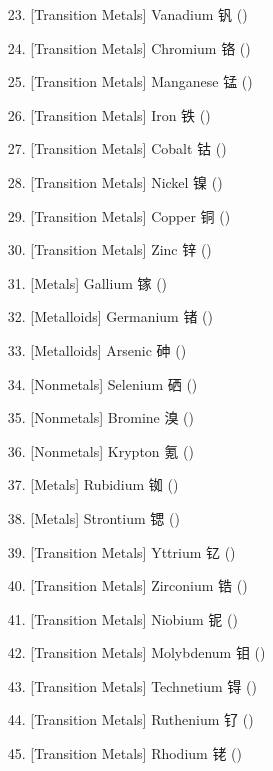 \begin{itemize}
\begin{itemize}
        \item[23.]      [Transition Metals]     Vanadium        钒  ()
        \item[24.]      [Transition Metals]     Chromium        铬  ()
        \item[25.]      [Transition Metals]     Manganese       锰  ()
        \item[26.]      [Transition Metals]     Iron            铁  ()
        \item[27.]      [Transition Metals]     Cobalt          钴  ()
        \item[28.]      [Transition Metals]     Nickel          镍  ()
        \item[29.]      [Transition Metals]     Copper          铜  ()
        \item[30.]      [Transition Metals]     Zinc            锌  ()
        \item[31.]      [Metals]                Gallium         镓  ()
        \item[32.]      [Metalloids]            Germanium       锗  ()
        \item[33.]      [Metalloids]            Arsenic         砷  ()
        \item[34.]      [Nonmetals]             Selenium        硒  ()
        \item[35.]      [Nonmetals]             Bromine         溴  ()
        \item[36.]      [Nonmetals]             Krypton         氪  ()
        \item[37.]      [Metals]                Rubidium        铷  ()
        \item[38.]      [Metals]                Strontium       锶  ()
        \item[39.]      [Transition Metals]     Yttrium         钇  ()
        \item[40.]      [Transition Metals]     Zirconium       锆  ()
        \item[41.]      [Transition Metals]     Niobium         铌  ()
        \item[42.]      [Transition Metals]     Molybdenum      钼  ()
        \item[43.]      [Transition Metals]     Technetium      锝  ()
        \item[44.]      [Transition Metals]     Ruthenium       钌  ()
        \item[45.]      [Transition Metals]     Rhodium         铑  ()

\end{itemize}
\end{itemize}
